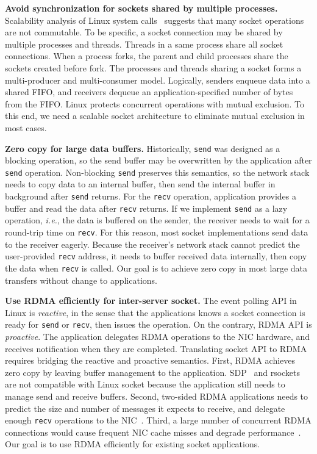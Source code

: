 \textbf{Avoid synchronization for sockets shared by multiple processes.}
Scalability analysis of Linux system calls~\cite{boyd2010analysis} suggests that many socket operations are not commutable. To be specific, a socket connection may be shared by multiple processes and threads. Threads in a same process share all socket connections. When a process forks, the parent and child processes share the sockets created before fork. The processes and threads sharing a socket forms a multi-producer and multi-consumer model. Logically, senders enqueue data into a shared FIFO, and receivers dequeue an application-specified number of bytes from the FIFO. Linux protects concurrent operations with mutual exclusion. To this end, we need a scalable socket architecture to eliminate mutual exclusion in most cases.


\textbf{Zero copy for large data buffers.}
Historically, \texttt{send} was designed as a blocking operation, so the send buffer may be overwritten by the application after \texttt{send} operation.
Non-blocking \texttt{send} preserves this semantics, so the network stack needs to copy data to an internal buffer, then send the internal buffer in background after \texttt{send} returns.
For the \texttt{recv} operation, application provides a buffer and read the data after \texttt{recv} returns.
If we implement \texttt{send} as a lazy operation, \textit{i.e.}, the data is buffered on the sender, the receiver needs to wait for a round-trip time on \texttt{recv}.
For this reason, most socket implementations send data to the receiver eagerly. Because the receiver's network stack cannot predict the user-provided \texttt{recv} address, it needs to buffer received data internally, then copy the data when \texttt{recv} is called.
Our goal is to achieve zero copy in most large data transfers without change to applications.

\textbf{Use RDMA efficiently for inter-server socket.}
The event polling API in Linux is \textit{reactive}, in the sense that the applications knows a socket connection is ready for \texttt{send} or \texttt{recv}, then issues the operation.
On the contrary, RDMA API is \textit{proactive}. The application delegates RDMA operations to the NIC hardware, and receives notification when they are completed.
Translating socket API to RDMA requires bridging the reactive and proactive semantics.
First, RDMA achieves zero copy by leaving buffer management to the application. SDP~\cite{socketsdirect} and rsockets~\cite{rsockets} are not compatible with Linux socket because the application still needs to manage send and receive buffers.
Second, two-sided RDMA applications needs to predict the size and number of messages it expects to receive, and delegate enough \texttt{recv} operations to the NIC~\cite{huang2017high}.
Third, a large number of concurrent RDMA connections would cause frequent NIC cache misses and degrade performance~\cite{mprdma,kaminsky2016design}.
Our goal is to use RDMA efficiently for existing socket applications.
